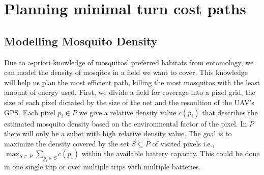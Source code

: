 \section[Path Planning]{Planning minimal turn cost paths}

\newcommand{\revised}[1]{{\color{red}#1}}


\subsection{Modelling Mosquito Density}
\label{subsec:modelling}
Due to a-priori knowledge of mosquitos' preferred habitats from entomology, we can model the density of mosqitos in a field we want to cover.
This knowledge will help us plan the most efficient path, killing the most mosquitos with the least amount of energy used.
First, we divide a field for coverage into a pixel grid, the size of each pixel dictated by the size of the net and the resoultion of the UAV's GPS.
Each pixel $p_i\in P$ we give a relative density value $c(p_i)$ that describes the estimated mosquito density based on the environmental factor of the pixel.
In $P$ there will only be a subet with high relative density value.
The goal is to maximize the density covered by the set $S\subseteq P$ of visited pixels i.e., $\max_{S\subseteq P} \sum_{p_i\in S} c(p_i)$ within the available battery capacity.
This could be done in one single trip or over multiple trips with multiple batteries.



